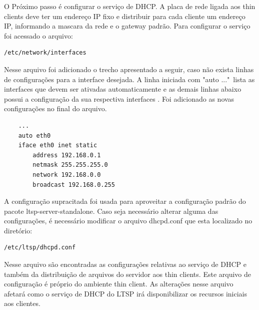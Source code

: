 \documentclass[
	12pt,				%
	openright,			%
	twoside,			%
	a4paper,			%
	chapter=TITLE,		%
	english,			%
	brazil				%
	]{abntex2}
\begin{document}
O Próximo passo é configurar o serviço de DHCP. A placa de rede ligada aos thin clients deve ter um endereço IP fixo e distribuir para cada cliente um endereço IP, informando a mascara da rede e o gateway padrão. Para configurar o serviço foi acessado o arquivo: 
\begin{verbatim}
/etc/network/interfaces
\end{verbatim} 
Nesse arquivo foi adicionado o trecho apresentado a seguir, caso não exista linhas de configurações para a interface desejada. A linha iniciada com "auto ..."\ lista as interfaces que devem ser ativadas automaticamente e as demais linhas abaixo possui a configuração da sua respectiva interfaces \cite{ClubeHardware,LTSP5}. Foi adicionado as novas configurações no final do arquivo. 
\begin{verbatim}
	...
	auto eth0  
	iface eth0 inet static
		address 192.168.0.1
		netmask 255.255.255.0
		network 192.168.0.0
		broadcast 192.168.0.255
\end{verbatim}
A configuração supracitada foi usada para aproveitar a configuração padrão  do pacote ltsp-server-standalone. Caso seja necessário alterar alguma das configurações, é necessário modificar o arquivo dhcpd.conf que esta localizado no diretório:
\begin{verbatim}
/etc/ltsp/dhcpd.conf
\end{verbatim}
Nesse arquivo são encontradas as configurações relativas ao serviço de DHCP e também da distribuição de arquivos do servidor aos thin clients. Este arquivo de configuração é próprio do ambiente thin client. As alterações nesse arquivo afetará como o  serviço de DHCP do LTSP irá disponibilizar os recursos iniciais aos clientes.
\end{document}
